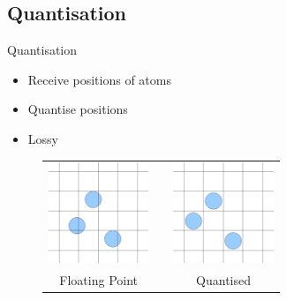 \documentclass{beamer}
\begin{document}
\subsection{Quantisation}
\begin{frame}{Quantisation}
  \begin{itemize}
  \item Receive positions of atoms
  \item Quantise positions
  \item Lossy %
  \end{itemize}
  \begin{figure}
    \centering
    \begin{tabular}{cp{4mm}c}
      \includegraphics[width=30mm]{unquantised} & &
      \includegraphics[width=30mm]{quantised} \\
      Floating Point & & Quantised
    \end{tabular}
  \end{figure}
\end{frame}
\end{document}
